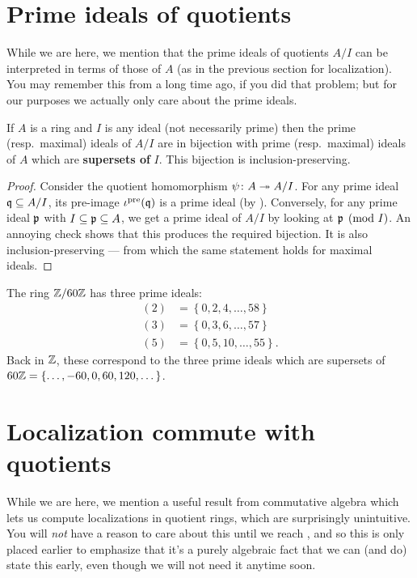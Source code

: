\section{Prime ideals of quotients}
While we are here, we mention that
the prime ideals of quotients $A/I$
can be interpreted in terms of those of $A$
(as in the previous section for localization).
You may remember this from 
a long time ago, if you did that problem;
but for our purposes we actually only care about the prime ideals.
\begin{proposition}
	\label{prop:prime_quotient}
	If $A$ is a ring and $I$ is any ideal (not necessarily prime)
	then the prime (resp.\ maximal) ideals of $A/I$
	are in bijection with prime (resp.\ maximal) ideals of $A$
	which are \textbf{supersets of} $I$.
	This bijection is inclusion-preserving.
\end{proposition}
\begin{proof}
	Consider the quotient homomorphism $\psi \colon A \twoheadrightarrow A/I$.
	For any prime ideal $\mathfrak q \subseteq A/I$,
	its pre-image $\iota^{\text{pre}}(\mathfrak q)$ is a prime ideal
	(by ).
	Conversely, for any prime ideal $\mathfrak p$
	with $I \subseteq \mathfrak p \subseteq A$,
	we get a prime ideal of $A/I$ by looking at $\mathfrak p \pmod I$.
	An annoying check shows that this produces the required bijection.
	It is also inclusion-preserving --- from which
	the same statement holds for maximal ideals.
\end{proof}
\begin{example}
	The ring $\mathbb Z/60\mathbb Z$ has three prime ideals:
	\begin{align*}
		(2) &= \left\{ 0, 2, 4, \dots, 58 \right\} \\
		(3) &= \left\{ 0, 3, 6, \dots, 57 \right\} \\
		(5) &= \left\{ 0, 5, 10, \dots, 55 \right\}.
	\end{align*}
	Back in $\mathbb Z$, these correspond to the three prime ideals
	which are supersets of
	$60\mathbb Z = \left\{ \dots, -60, 0, 60, 120, \dots \right\}$.
\end{example}

\section{Localization commute with quotients}
While we are here, we mention a useful result from
commutative algebra which lets us compute localizations in quotient rings,
which are surprisingly unintuitive.
You will \emph{not} have a reason to care about this
until we reach ,
and so this is only placed earlier to emphasize that it's
a purely algebraic fact that we can (and do) state this early,
even though we will not need it anytime soon.

